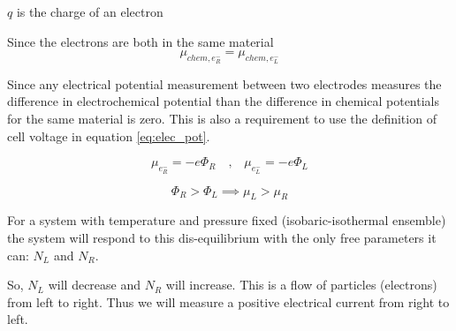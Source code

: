 $q$ is the charge of an electron

Since the electrons are both in the same material
\begin{equation}
    \mu_{chem, \textit{e}^{-}_{R}} = \mu_{chem, \textit{e}^{-}_{L}}
\end{equation}

Since any electrical potential measurement between two electrodes measures the difference in electrochemical potential than the difference in chemical potentials for the same material is zero. This is also a requirement to use the definition of cell voltage in equation \ref{eq:elec_pot}.

\begin{equation}
    \mu_{\textit{e}^-_R} = -\textit{e} \Phi_R \quad \text{,} \quad \mu_{\textit{e}^-_L} = -\textit{e} \Phi_L
\end{equation}

\begin{equation}
    \Phi_R > \Phi_L \implies \mu_L > \mu_R
\end{equation}

For a system with temperature and pressure fixed (isobaric-isothermal ensemble) the system will respond to this dis-equilibrium with the only free parameters it can: $N_L$ and $N_R$.

So, $N_L$ will decrease and $N_R$ will increase. This is a flow of particles (electrons) from left to right. Thus we will measure a positive electrical current from right to left.